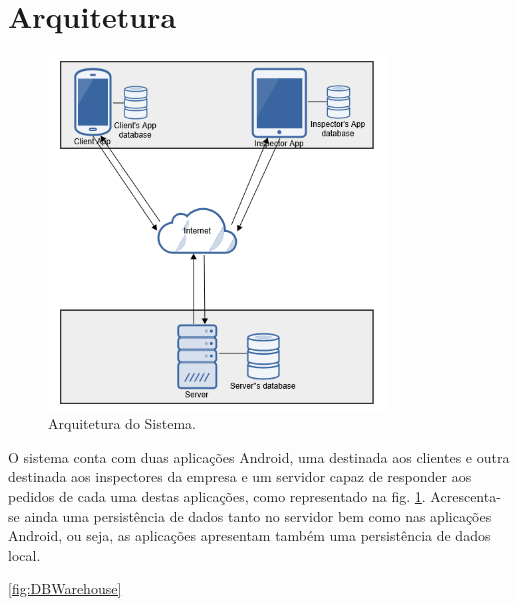 \documentclass[12pt]{article}
\begin{document}
\section{Arquitetura}

\begin{figure}[h!]
    \centering
    \includegraphics[width=0.8\textwidth]{arch.png}
    \caption{Arquitetura do Sistema.}
    \label{fig:arch}
\end{figure}

O sistema conta com duas aplicações Android, uma destinada aos clientes e outra destinada aos inspectores da empresa e um servidor capaz de responder aos pedidos de cada uma destas aplicações, como representado na fig. \ref{fig:arch}. Acrescenta-se ainda uma persistência de dados tanto no servidor bem como nas aplicações Android, ou seja, as aplicações apresentam também uma persistência de dados local.

\ref{fig:DBWarehouse}

\newpage
\end{document}
